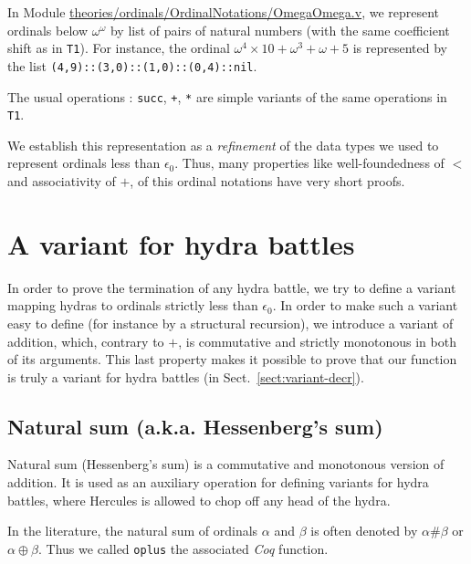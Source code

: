     In Module   \href{https://github.com/coq-community/hydra-battles/blob/master/theories/ordinals/OrdinalNotations/OmegaOmega.v}{theories/ordinals/OrdinalNotations/OmegaOmega.v},
    we represent ordinals below $\omega^\omega$ by list of pairs of natural numbers (with the same coefficient shift as in \texttt{T1}).
    For instance, the ordinal $\omega^4\times 10 + \omega^3 + \omega+ 5$ is represented by the list \texttt{(4,9)::(3,0)::(1,0)::(0,4)::nil}.

  The usual operations : \texttt{succ}, \texttt{+}, \texttt{*} are simple variants of the same operations in \texttt{T1}.

    We establish this representation as a \emph{refinement} of the data types we used to represent ordinals less than $\epsilon_0$. Thus, many properties like well-foundedness of $<$ and associativity of $+$,  of this ordinal notations have very short proofs.
    
    \section{A variant for hydra battles}

    In order to prove the termination of any hydra battle, we try to define a variant mapping hydras to ordinals strictly less than $\epsilon_0$.
    In order to make such a variant easy to define (for instance by a structural recursion), we introduce a variant of addition, which, contrary to
    $+$, is commutative and strictly monotonous in both of its arguments. This last property makes it possible to prove that our function is 
    truly a variant for hydra battles (in Sect.~\vref{sect:variant-decr}).

    \subsection{Natural sum (a.k.a. Hessenberg's  sum)}
    \label{sec:orgheadline87}
    \label{hydra-variant}

    Natural sum (Hessenberg's  sum) is a commutative and monotonous version of
    addition. It is used as an auxiliary operation  for defining variants
    for hydra battles, where Hercules is allowed to chop off any  head of the hydra.

    In the literature, the natural sum of ordinals \(\alpha\) and \(\beta\)
    is often denoted by \(\alpha \# \beta\)  or  \(\alpha \oplus  \beta\).
    Thus we called \texttt{oplus} the associated \emph{Coq} function.

